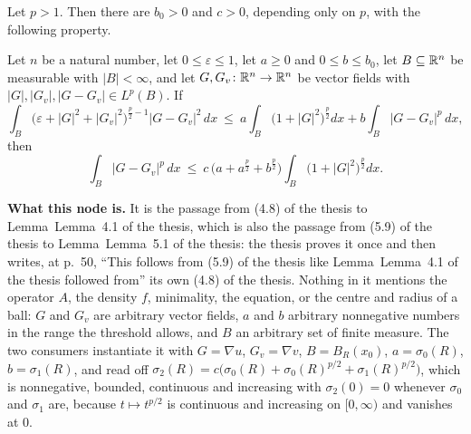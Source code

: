\begin{lemma}
Let $p>1$.  Then there are $b_0>0$ and $c>0$, depending only on $p$, with the
following property.

Let $n$ be a natural number, let $0\le\varepsilon\le1$, let $a\ge0$ and
$0\le b\le b_0$, let $B\subseteq\mathbb{R}^n$ be measurable with $|B|<\infty$, and let
$G,G_v\colon\mathbb{R}^n\to\mathbb{R}^n$ be vector fields with
$|G|,|G_v|,|G-G_v|\in L^p(B)$.  If
\[
\int_B\bigl(\varepsilon+|G|^2+|G_v|^2\bigr)^{\frac p2-1}|G-G_v|^2\,dx
\ \le\ a\int_B\bigl(1+|G|^2\bigr)^{\frac p2}dx
+b\int_B|G-G_v|^p\,dx ,
\tag{H}
\]
then
\[
\int_B|G-G_v|^p\,dx
\ \le\ c\,\bigl(a+a^{\frac p2}+b^{\frac p2}\bigr)
\int_B\bigl(1+|G|^2\bigr)^{\frac p2}dx .
\]

\noindent\textbf{What this node is.}  It is the passage from (4.8) of the thesis to
Lemma~Lemma~4.1 of the thesis, which is also the passage from (5.9) of the thesis to
Lemma~Lemma~5.1 of the thesis: the thesis proves it once and then writes, at p.~50,
``This follows from (5.9) of the thesis like Lemma~Lemma~4.1 of the thesis followed from''
its own (4.8) of the thesis.  Nothing in it mentions the operator $A$, the density
$f$, minimality, the equation, or the centre and radius of a ball: $G$ and $G_v$
are arbitrary vector fields, $a$ and $b$ arbitrary nonnegative numbers in the
range the threshold allows, and $B$ an arbitrary set of finite measure.  The two
consumers instantiate it with $G=\nabla u$, $G_v=\nabla v$, $B=B_R(x_0)$,
$a=\sigma_0(R)$, $b=\sigma_1(R)$, and read off
$\sigma_2(R)=c\bigl(\sigma_0(R)+\sigma_0(R)^{p/2}+\sigma_1(R)^{p/2}\bigr)$,
which is nonnegative, bounded, continuous and increasing with $\sigma_2(0)=0$
whenever $\sigma_0$ and $\sigma_1$ are, because $t\mapsto t^{p/2}$ is
continuous and increasing on $[0,\infty)$ and vanishes at $0$.


\end{lemma}
